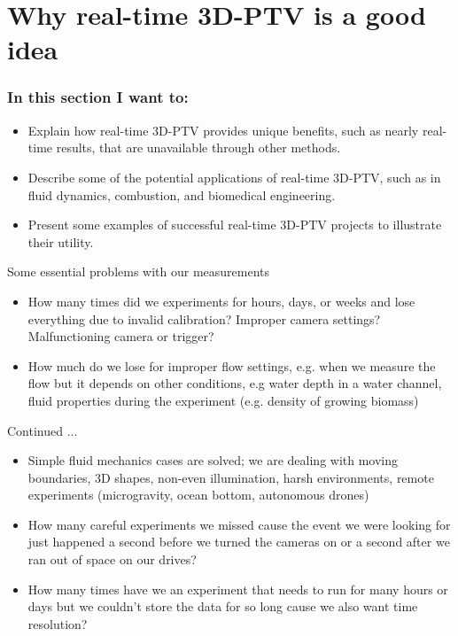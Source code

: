 
\section{Why real-time 3D-PTV is a good idea}

\begin{frame}
\frametitle{In this section I want to:}
\begin{itemize}
\item Explain how real-time 3D-PTV provides unique benefits, such as nearly real-time results, that are unavailable through other methods.
\item Describe some of the potential applications of real-time 3D-PTV, such as in fluid dynamics, combustion, and biomedical engineering.
\item Present some examples of successful real-time 3D-PTV projects to illustrate their utility.
\end{itemize}
\end{frame}

\begin{frame}{Some essential problems with our measurements}

\begin{itemize}
    \item How many times did we experiments for hours, days, or weeks and lose everything due to invalid calibration? Improper camera settings? Malfunctioning camera or trigger? 
    \item How much do we lose for improper flow settings, e.g. when we measure the flow but it depends on other conditions, e.g water depth in a water channel, fluid properties during the experiment (e.g. density of growing biomass)
\end{itemize}
\end{frame}

\begin{frame}{Continued ...}
\begin{itemize}
    \item Simple fluid mechanics cases are solved; we are dealing with moving boundaries, 3D shapes, non-even illumination, harsh environments, remote experiments (microgravity, ocean bottom, autonomous drones)
    \item How many careful experiments we missed cause the event we were looking for just happened a second before we turned the cameras on or a second after we ran out of space on our drives?
    \item How many times have we an experiment that needs to run for many hours or days but we couldn't store the data for so long cause we also want time resolution? 
\end{itemize}
    
\end{frame}



